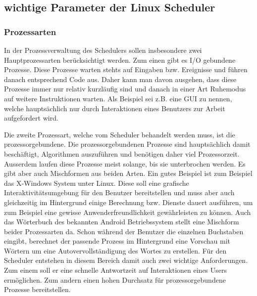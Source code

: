 \subsection{wichtige Parameter der Linux Scheduler}
\subsubsection{Prozessarten}
In der Prozessverwaltung des Schedulers sollen insbesondere zwei Hauptprozessarten berücksichtigt werden. Zum einen gibt es I/O gebundene Prozesse. Diese Prozesse warten stehts auf Eingaben bzw. Ereignisse und führen danach entsprechend Code aus. Daher kann man davon ausgehen, dass diese Prozesse immer nur relativ kurzläufig sind und danach in einer Art Ruhemodus auf weitere Instruktionen warten. Als Beispiel sei z.B. eine GUI zu nennen, welche hauptsächlich nur durch Interaktionen eines Benutzers zur Arbeit aufgefordert wird.

Die zweite Prozessart, welche vom Scheduler behandelt werden muss, ist die prozessorgebundene. Die prozessorgebundenen Prozesse sind hauptsächlich damit beschäftigt, Algorithmen auszuführen und be\-nötigen daher viel Prozessorzeit. Ausserdem laufen diese Prozesse meist solange, bis sie unterbrochen werden.
Es gibt aber auch Mischformen aus beiden Arten. Ein gutes Beispiel ist zum Beispiel das X-Windows System unter Linux. Diese soll eine grafische Interaktivitätsumgebung für den Benutzer bereitstellen und muss aber auch gleichzeitig im Hintergrund einige Berechnung bzw. Dienste dauert ausführen, um zum Beispiel eine gewisse Anwenderfreundlichkeit gewähr\-leis\-ten zu können. 
Auch das Wörterbuch des bekannten Android Betriebssystem stellt eine Mischform beider Prozessarten da. Schon während der Benutzer die einzelnen Buchstaben eingibt, berechnet der passende Prozess im Hintergrund eine Vorschau mit Wörtern um eine Auto\-ver\-voll\-ständigung des Wortes zu erstellen.
Für den Scheduler entstehen in diesem Bereich damit auch zwei wichtige Anforderungen. Zum einem soll er eine schnelle Antwortzeit auf Interaktionen eines Users ermöglichen. Zum andern einen hohen Durchsatz für prozessorgebundene Prozesse bereitstellen.

